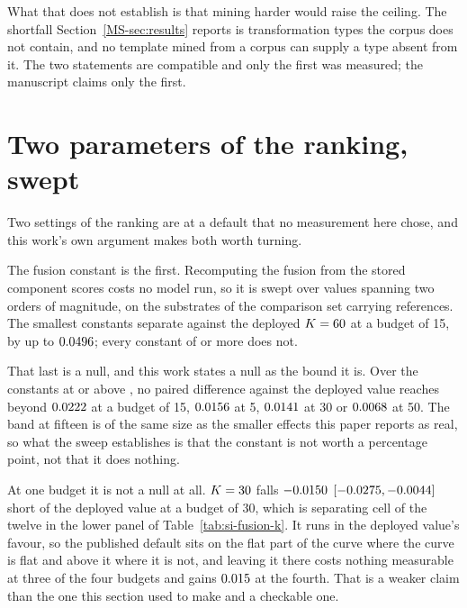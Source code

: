 \documentclass[journal=jcisd8,manuscript=suppinfo,layout=onecolumn]{achemso}
\begin{document}
What that does not establish is that mining harder would raise the ceiling. The shortfall
Section~\ref{MS-sec:results} reports is transformation types the corpus does not contain, and no
template mined from a corpus can supply a type absent from it. The two statements are
compatible and only the first was measured; the manuscript claims only the first.

\section{Two parameters of the ranking, swept}
\label{sec:si-aggregation}
\label{sec:si-knobs}

Two settings of the ranking are at a default that no measurement here chose, and this work's own
argument makes both worth turning.

The fusion constant is the first. Recomputing the fusion from the stored component scores costs no
model run, so it is swept over \numFusionkSweptWord{} values spanning two orders of magnitude, on
the \numFusionkSubstrates{} substrates of the comparison set carrying \numFusionkReferences{}
references. The \numFusionkSeparatingWord{} smallest constants separate against the deployed
$K = 60$ at a budget of 15, by up to $0.0496$; every constant of
\numFusionkFlatfrom{} or more does not.

That last is a null, and this work states a null as the bound it is. Over
the constants at or above \numFusionkFlatfrom{}, no paired difference against the deployed value
reaches beyond $0.0222$ at a budget of 15, $0.0156$ at 5,
$0.0141$ at 30 or $0.0068$ at 50. The band at fifteen is
of the same size as the smaller effects this paper reports as real, so what the sweep establishes
is that the constant is not worth a percentage point, not that it does nothing.

At one budget it is not a null at all. $K = 30$ falls
$-0.0150$ $[-0.0275, -0.0044]$ short of the deployed value at a
budget of 30, which is \numFusionkNullbreaksWord{} separating cell of the twelve in the lower
panel of Table~\ref{tab:si-fusion-k}. It runs in the deployed value's favour, so the published
default sits on the flat part of the curve where the curve is flat and above it where it is not,
and leaving it there costs nothing measurable at three of the four budgets and gains
$0.015$ at the fourth. That is a weaker claim than the one this section used to
make and a checkable one.
\end{document}
